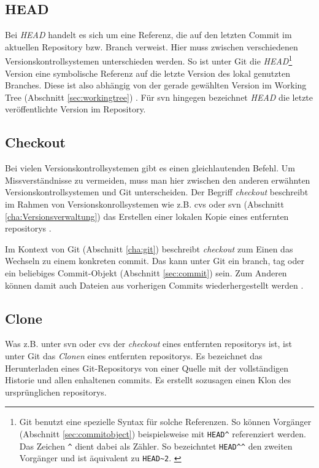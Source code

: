 \subsection{HEAD}\label{sec:head}
Bei \textit{HEAD} handelt es sich um eine Referenz, die auf den letzten Commit
im aktuellen Repository bzw. Branch verweist. Hier muss zwischen verschiedenen
Versionskontrollsystemen unterschieden werden. So ist unter Git die
\textit{HEAD}\footnote{Git benutzt eine spezielle Syntax für solche Referenzen.
So können Vorgänger (Abschnitt \ref{sec:commitobject}) beispielsweise mit
\texttt{HEAD\^{}} referenziert werden. Das Zeichen \texttt{\^{}} dient dabei
als Zähler. So bezeichntet \texttt{HEAD\^{}\^{}} den zweiten Vorgänger und ist
äquivalent zu \texttt{HEAD\~{}2}. \cite[S.~65]{gitosp}} Version eine
symbolische Referenz auf die letzte Version des lokal genutzten Branches. Diese
ist also abhängig von der gerade gewählten Version im Working Tree (Abschnitt
\ref{sec:workingtree}) \cite[S.~20]{gitosp}. Für \acrshort{svn} hingegen
bezeichnet \textit{HEAD} die letzte veröffentlichte Version im Repository.

\subsection{Checkout}\label{sec:checkout}
Bei vielen Versionskontrollsystemen gibt es einen gleichlautenden Befehl.
Um Missverständnisse zu vermeiden, muss man hier zwischen den anderen erwähnten
Versionskontrollsystemen und Git unterscheiden. Der Begriff \textit{checkout}
beschreibt im Rahmen von Versionskonrollsystemen wie z.B. \acrshort{cvs} oder
\acrshort{svn} (Abschnitt \ref{cha:Versionsverwaltung}) das Erstellen einer
lokalen Kopie eines entfernten \glspl{repository} \cite[S~137]{gitosp}.

Im Kontext von Git (Abschnitt \ref{cha:git}) beschreibt \textit{checkout} zum
Einen das Wechseln zu einem konkreten \gls{commit}. Das kann unter Git ein
\gls{branch}, \gls{tag} oder ein beliebiges Commit-Objekt (Abschnitt
\ref{sec:commit}) sein. Zum Anderen können damit auch Dateien aus vorherigen
Commits wiederhergestellt werden \cite[S~76]{gitosp}.

\subsection{Clone}\label{sec:clone}
Was z.B. unter \acrshort{svn} oder \acrshort{cvs} der \textit{checkout} eines
entfernten \glspl{repository} ist, ist unter Git das \textit{Clonen} eines
entfernten \glspl{repository}. Es bezeichnet das Herunterladen eines
Git-Repositorys von einer Quelle mit der vollständigen Historie und allen
enhaltenen \glspl{commit}. Es erstellt sozusagen einen Klon des
ursprünglichen \glspl{repository}. \cite[S.~21]{gitosp}

